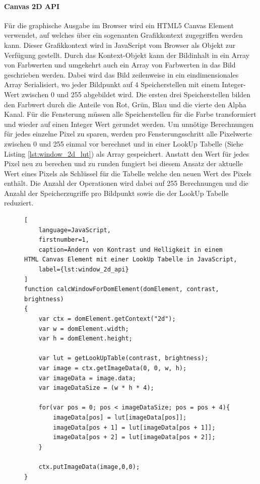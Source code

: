\paragraph{Canvas 2D API}
Für die graphische Ausgabe im Browser wird ein HTML5 Canvas Element verwendet,
auf welches über ein sogenanten Grafikkontext zugegriffen werden kann. 
Dieser Grafikkontext wird in JavaScript vom Browser als Objekt zur Verfügung gestellt.
Durch das Kontext-Objekt kann der Bildinhalt in ein Array von Farbwerten und umgekehrt auch ein Array von Farbwerten in das Bild geschrieben werden.
Dabei wird das Bild zeilenweise in ein eindimensionales Array Serialisiert, 
wo jeder Bildpunkt auf 4 Speicherstellen mit einem Integer-Wert zwischen 0 und 255 abgebildet wird.
Die ersten drei Speicherstellen bilden den Farbwert durch die Anteile von Rot, Grün, Blau und die vierte den Alpha Kanal.
Für die Fensterung müssen alle Speicherstellen für die Farbe transformiert und wieder auf einen Integer Wert gerundet werden.
%
Um unnötige Berechnungen für jedes einzelne Pixel zu sparen, 
werden pro Fensterungsschritt alle Pixelwerte zwischen 0 und 255 einmal vor berechnet und in einer LookUp Tabelle (Siehe Listing \ref{lst:window_2d_lut}) als Array gespeichert.
Anstatt den Wert für jedes Pixel neu zu berechen und zu runden fungiert bei diesem Ansatz der aktuelle Wert eines Pixels als Schlüssel für die Tabelle welche den neuen Wert des Pixels enthält.
Die Anzahl der Operationen wird dabei auf 255 Berechnungen und die Anzahl der Speicherzugriffe pro Bildpunkt sowie die der LookUp Tabelle reduziert.
\begin{figure}[t]
\begin{lstlisting}[
	language=JavaScript,
	firstnumber=1,
	caption=Ändern von Kontrast und Helligkeit in einem HTML Canvas Element mit einer LookUp Tabelle in JavaScript,
	label={lst:window_2d_api}
]
function calcWindowForDomElement(domElement, contrast, brightness)
{
    var ctx = domElement.getContext("2d");
    var w = domElement.width;
    var h = domElement.height;

    var lut = getLookUpTable(contrast, brightness);
    var image = ctx.getImageData(0, 0, w, h);
    var imageData = image.data;
    var imageDataSize = (w * h * 4);

    for(var pos = 0; pos < imageDataSize; pos = pos + 4){
        imageData[pos] = lut[imageData[pos]];
        imageData[pos + 1] = lut[imageData[pos + 1]];
        imageData[pos + 2] = lut[imageData[pos + 2]];
    }

    ctx.putImageData(image,0,0);
}
\end{lstlisting}
\end{figure}
